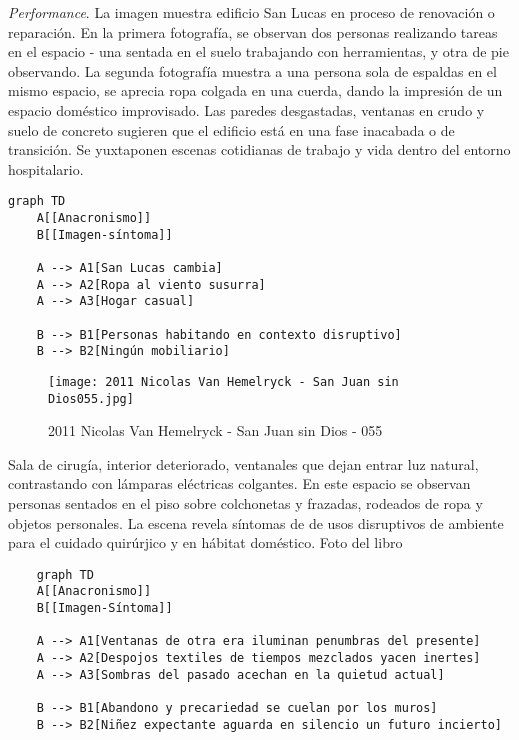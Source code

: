 \textit{Performance}. La imagen muestra edificio San Lucas en proceso de renovación o reparación. En la primera fotografía, se observan dos personas realizando tareas en el espacio - una sentada en el suelo trabajando con herramientas, y otra de pie observando. La segunda fotografía muestra a una persona sola de espaldas en el mismo espacio, se aprecia ropa colgada en una cuerda, dando la impresión de un espacio doméstico improvisado. Las paredes desgastadas, ventanas en crudo y suelo de concreto sugieren que el edificio está en una fase inacabada o de transición. Se yuxtaponen  escenas cotidianas de trabajo y vida dentro del entorno hospitalario.

\small
\begin{verbatim}
graph TD
    A[[Anacronismo]]
    B[[Imagen-síntoma]]

    A --> A1[San Lucas cambia]
    A --> A2[Ropa al viento susurra]
    A --> A3[Hogar casual]

    B --> B1[Personas habitando en contexto disruptivo]
    B --> B2[Ningún mobiliario]
\end{verbatim}
\normalsize

\clearpage
\begin{figure}[h!]
    \centering
    \texttt{[image: 2011 Nicolas Van Hemelryck - San Juan sin Dios055.jpg]}
    \caption{2011 Nicolas Van Hemelryck - San Juan sin Dios - 055}
    \label{fig:2011NicolasVanHemelryckSanJuansinDios-055}
\end{figure}

Sala de cirugía, interior deteriorado, ventanales que dejan entrar luz natural, contrastando con lámparas eléctricas colgantes. En este espacio se observan personas sentados en el piso sobre colchonetas y frazadas, rodeados de ropa y objetos personales. La escena revela síntomas de de usos disruptivos de ambiente para el cuidado quirúrjico y en hábitat doméstico. Foto del libro \parencite{Hemelryck2011}

\small
\begin{verbatim}
    graph TD
    A[[Anacronismo]]
    B[[Imagen-Síntoma]]

    A --> A1[Ventanas de otra era iluminan penumbras del presente]
    A --> A2[Despojos textiles de tiempos mezclados yacen inertes]
    A --> A3[Sombras del pasado acechan en la quietud actual]

    B --> B1[Abandono y precariedad se cuelan por los muros]
    B --> B2[Niñez expectante aguarda en silencio un futuro incierto]

\end{verbatim}
\normalsize


